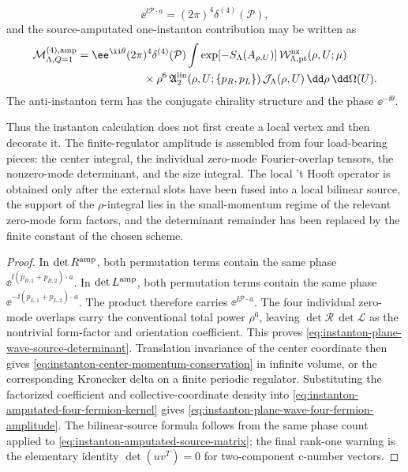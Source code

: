 \begin{proposition}
\begin{equation}
  \ee^{\ii\mathcal P\cdot a}
  =
  (2\pi)^4\delta^{(4)}(\mathcal P),
  \label{eq:instanton-center-momentum-conservation}
\end{equation}
and the source-amputated one-instanton contribution may be written as
\begin{equation}
\begin{aligned}
  \mathcal M^{(4),{\rm amp}}_{\Lambda,Q=1}
  &=
  \ee^{\ii\theta}
  (2\pi)^4\delta^{(4)}(\mathcal P)
  \int
  \exp[-S_\Lambda(A_{\rho,U})]\,
  \mathcal W_{\Lambda,{\rm pt}}^{\rm nz}(\rho,U;\mu) \\
  &\qquad\qquad\qquad
  {}\times
  \rho^6\,
  \mathfrak A_2^{\rm lin}(\rho,U;\{p_R,p_L\})\,
  \mathcal J_\Lambda(\rho,U)\,
  \dd\rho\,\dd\Omega(U).
\end{aligned}
  \label{eq:instanton-plane-wave-four-fermion-amplitude}
\end{equation}
The anti-instanton term has the conjugate chirality structure and the phase
\(\ee^{-\ii\theta}\).

Thus the instanton calculation does not first create a local vertex and then
decorate it.  The finite-regulator amplitude is assembled from four
load-bearing pieces: the center integral, the individual zero-mode
Fourier-overlap tensors, the nonzero-mode determinant, and the size integral.
The local 't Hooft operator is obtained only after the external slots have
been fused into a local bilinear source, the support of the \(\rho\)-integral
lies in the small-momentum regime of the relevant zero-mode form factors, and
the determinant remainder has been replaced by the finite constant of the
chosen scheme.
\end{proposition}

\begin{proof}
In \(\det R^{\rm amp}\), both permutation terms contain the same phase
\(\ee^{\ii(p_{R,1}+p_{R,2})\cdot a}\).  In \(\det L^{\rm amp}\), both
permutation terms contain the same phase
\(\ee^{-\ii(p_{L,1}+p_{L,2})\cdot a}\).  The product therefore carries
\(\ee^{\ii\mathcal P\cdot a}\).  The four individual zero-mode overlaps carry
the conventional total power \(\rho^6\), leaving
\(\det\mathcal R\,\det\mathcal L\) as the nontrivial form-factor and
orientation coefficient.  This proves
\eqref{eq:instanton-plane-wave-source-determinant}.  Translation invariance of
the center coordinate then gives
\eqref{eq:instanton-center-momentum-conservation} in infinite volume, or the
corresponding Kronecker delta on a finite periodic regulator.  Substituting the
factorized coefficient and collective-coordinate density into
\eqref{eq:instanton-amputated-four-fermion-kernel} gives
\eqref{eq:instanton-plane-wave-four-fermion-amplitude}.  The bilinear-source
formula follows from the same phase count applied to
\eqref{eq:instanton-amputated-source-matrix}; the final rank-one warning is
the elementary identity \(\det(u v^T)=0\) for two-component c-number vectors.
\end{proof}

